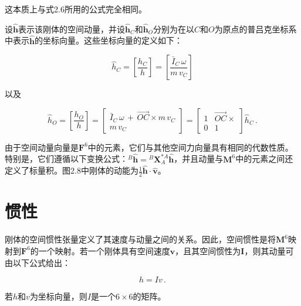 \documentclass[10pt,a4paper]{book}
\theoremstyle{thmstyle} %
\theoremstyle{defstyle} %
\theoremstyle{prostyle} %
\begin{document}
这本质上与式2.6所用的公式完全相同。



设$\hat{\boldsymbol{h}}$表示该刚体的空间动量，并设$\hat{\boldsymbol{h}}_{C}$和$\hat{\boldsymbol{h}}_{O}$分别为在以$C$和$O$为原点的普吕克坐标系中表示$\hat{\boldsymbol{h}}$的坐标向量。这些坐标向量的定义如下：



$$
\hat { h } _ { C } = \left[ \frac { h _ { C } } { h } \right] = \left[ \frac { \bar { I } _ { C } \, \omega } { m \, v _ { C } } \right]
$$



以及



$$
\hat { h } _ { O } = \left[ \frac { h _ { O } } { h } \right] = \left[ \begin{array}{l} { \bar { I } _ { C } \, \omega \, + \, \overrightarrow { O C } \times m \, v _ { C } } \\{ m \, v _ { C } } \end{array} \right] = \left[ \begin{array}{ll} { 1 } & { \overrightarrow { O C } \times } \\{ 0 } & { 1 } \end{array} \right] \hat { h } _ { C } \, .
$$



由于空间动量向量是$\mathbf{F}^{6}$中的元素，它们与其他空间力向量具有相同的代数性质。特别是，它们遵循以下变换公式：${}^{B}\hat{\mathbf{h}}={}^{B}\mathbf{X}_{A}^{*A}\hat{\mathbf{h}}$，并且动量与$\mathbf{M}^{6}$中的元素之间还定义了标量积。图2.8中刚体的动能为$\frac{1}{2}\hat{\mathbf{h}}\cdot\hat{\mathbf{v}}$。



\section{惯性}





刚体的空间惯性张量定义了其速度与动量之间的关系。因此，空间惯性是将$\mathbf{M}^{6}$映射到$\mathbf{F}^{6}$的一个映射。若一个刚体具有空间速度$\boldsymbol{v}$，且其空间惯性为$\boldsymbol{I}$，则其动量可由以下公式给出：



$$
h = I v \, .
$$



若$h$和$v$为坐标向量，则$I$是一个$6 \times 6$的矩阵。
\end{document}
